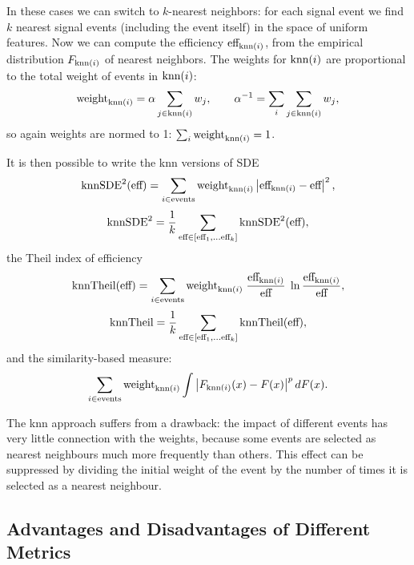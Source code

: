 In these cases we can switch to $k$-nearest neighbors: for each signal event we find $k$ nearest signal events (including the event itself)
in the space of uniform features. Now we can compute the efficiency $\text{eff}_{\text{knn}(i)}$, from the empirical distribution $F_{\text{knn}(i)}$ of nearest neighbors. 
The weights for $\text{knn}(i)$ are proportional to the total weight of events in $\text{knn}(i)$:
\[
	\text{weight}_{\text{knn}(i)} = \alpha \sum_{j \in \text{knn}(i)} w_j, \qquad \alpha^{-1} = \sum_i \sum_{j \in \text{knn}(i)} w_j,
\]
so again weights are normed to 1: $\sum_{i} \text{weight}_{\text{knn}(i)} = 1$. 

It is then possible to write the knn versions of SDE
\[
	\text{knnSDE}^2(\text{eff})
		= \sum_{i \in \text{events}} \text{weight}_{\text{knn}(i)} \left\vert\text{eff}_{\text{knn}(i)} - \text{eff}\right\vert^2,
\]
\[
	\text{knnSDE}^2 = \frac{1}{k} \sum_{\text{eff} \in [\text{eff}_1, \dots \text{eff}_k]} \text{knnSDE}^2(\text{eff}),
\]
the Theil index of efficiency
\[
	\text{knnTheil}(\text{eff}) = \sum_{i \in \text{events}} \text{weight}_{\text{knn}(i)} \; \frac{\text{eff}_{\text{knn}(i)}}{\text{eff}} \; \ln{\frac{\text{eff}_{\text{knn}(i)}}{\text{eff}}},
\]
\[
	\text{knnTheil} = \frac{1}{k} \sum_{\text{eff} \in [\text{eff}_1, \dots \text{eff}_k]} \text{knnTheil}(\text{eff}),
\]
and the similarity-based measure:
\[
	 \sum_{i \in \text{events}} \text{weight}_{\text{knn}(i)} \int \left\vert F_{\text{knn}(i)}(x) - F(x)\right\vert^p dF(x).
\]


The knn approach suffers from a drawback: the impact of different events has very little connection with the weights,
because some events are selected as nearest neighbours much more frequently than others.
This effect can be suppressed by dividing the initial weight of the event by the number of times it is selected 
as a nearest neighbour. 

\subsection{Advantages and Disadvantages of Different Metrics}
